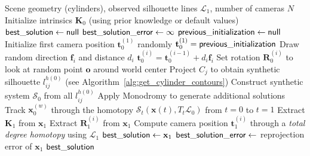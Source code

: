 \begin{algorithm}[H]
\caption{Solution Generation and Homotopy Procedure}
\label{alg:solutions_generation}
\begin{algorithmic}[1]
\REQUIRE Scene geometry (cylinders), observed silhouette lines $\mathcal{L}_1$, number of cameras $N$
\STATE Initialize intrinsics $\mathbf{K}_0$ (using prior knowledge or default values)
\STATE $\mathsf{best\_solution} \gets \mathsf{null}$
\STATE $\mathsf{best\_solution\_error} \gets \infty$
\STATE $\mathsf{previous\_initialization} \gets \mathsf{null}$
      \STATE Initialize first camera position $\mathbf{t}_0^{(1)}$ randomly
  \ELSE
      \STATE $\mathbf{t}_0^{(1)} = \mathsf{previous\_initialization}$
  \ENDIF
      \STATE Draw random direction $\mathbf{f}_i$ and distance $d_i$
      \STATE $\mathbf{t}_0^{(i)} = \mathbf{t}_0^{(i-1)} + d_i \mathbf{f}_i$
      \STATE Set rotation $\mathbf{R}_0^{(i)}$ to look at random point $\mathbf{o}$ around world center
  \ENDFOR
          \STATE Project $C_j$ to obtain synthetic silhouette $l_{ij}^{h(0)}$ (see Algorithm~\ref{alg:get_cylinder_contours})
      \ENDFOR
  \ENDFOR
  \STATE Construct synthetic system $\mathcal{S}_0$ from all $l_{ij}^{h(0)}$
  \STATE Apply Monodromy to generate additional solutions
      \STATE Track $\mathbf{x}_0^{(w)}$ through the homotopy $\mathcal{S}_t(\mathbf{x}(t), T_t\mathcal{L}_0)$ from $t=0$ to $t=1$
          \STATE Extract $\mathbf{K}_1$ from $\mathbf{x}_1$
              \STATE Extract $\mathbf{R}_1^{(i)}$ from $\mathbf{x}_1$
              \STATE Compute camera position $\mathbf{t}_1^{(i)}$ through a \emph{total degree homotopy} using $\mathcal{L}_1$
          \ENDFOR
              \STATE $\mathsf{best\_solution} \gets \mathbf{x}_1$
              \STATE $\mathsf{best\_solution\_error} \gets$ reprojection error of $\mathbf{x}_1$
          \ENDIF
      \ENDIF
  \ENDFOR
      \RETURN $\mathsf{best\_solution}$
  \ENDIF
\ENDFOR
\end{algorithmic}
\end{algorithm}
